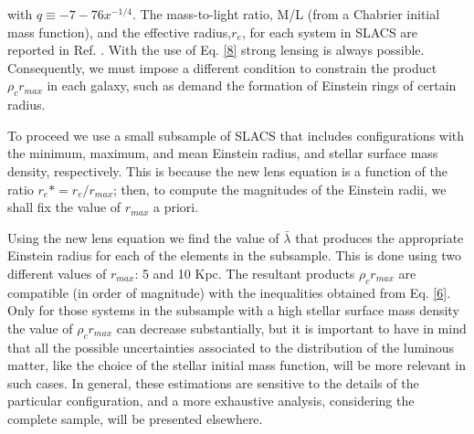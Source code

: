\documentclass[15pt]{IEEEtran}
\begin{document}
with \(q \equiv -7-76x^{-1/4}\). The  mass-to-light  ratio, M/L (from  a  Chabrier  initial  mass  function),  and  the  effective radius,\(r_e\),  for each system in SLACS are reported in Ref. \cite{Auger_2009}. With the use of Eq. \eqref{8} strong lensing is always possible. Consequently, we must impose a different condition to constrain the product \(\rho_c r_{max}\) in each galaxy, such as demand the formation of Einstein rings of certain radius.
\par
To proceed we use a small subsample of SLACS that includes configurations with the minimum, maximum, and mean  Einstein  radius,  and  stellar  surface  mass  density, respectively.  This is because the new lens equation is a function of the ratio \(r_e* = r_e/r_{max}\); then, to compute the magnitudes of the Einstein radii, we shall fix the value of \(r_{max}\) a priori.
\par
Using the new lens equation we find the value of \(\bar{\lambda}\) that produces the appropriate Einstein radius for each of the elements in the subsample.  This is done using two different values of \(r_{max}\): 5 and 10 Kpc.  The resultant products \(\rho_c r_{max}\) are compatible (in order of magnitude) with the inequalities obtained from Eq. \eqref{6}.  Only for those systems in the subsample with a high stellar surface mass density  the  value  of \(\rho_c r_{max}\) can decrease  substantially, but it is important to have in mind that all the possible uncertainties associated to the distribution of the luminous  matter,  like  the  choice  of  the  stellar  initial  mass function,  will  be  more  relevant  in  such  cases.   In  general, these estimations are sensitive to the details of the particular  configuration,  and  a  more  exhaustive  analysis,  considering  the  complete  sample,  will  be  presented elsewhere.
\onecolumn
\end{document}

